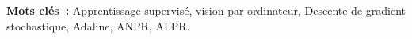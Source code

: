 \documentclass[11pt,a4paper]{report}
\begin{document}
	
	\vspace{1 cm}
		
	\textbf{Mots clés~:} Apprentissage supervisé, vision par ordinateur, Descente de gradient stochastique, Adaline, ANPR, ALPR.
	
	\pagebreak
	
	\tableofcontents
	
	\pagebreak
	
	
	
	
	
	
	
	
	
	
	
	
	
	
	 
	
	\nocite{*}
	
	
	
	
	
	
	
	
\end{document}
